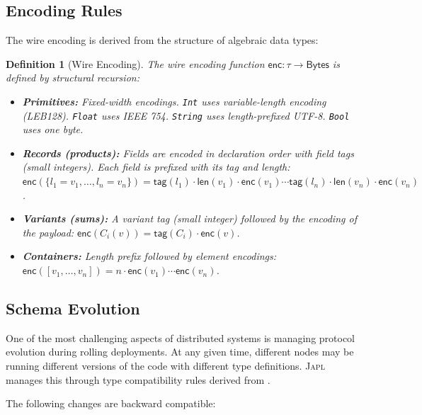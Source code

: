 \documentclass[11pt,a4paper]{article}
\newtheorem{definition}[theorem]{Definition}
\newcommand{\japl}{\textsc{Japl}}
\begin{document}
\subsection{Encoding Rules}

The wire encoding is derived from the structure of algebraic data types:

\begin{definition}[Wire Encoding]
The wire encoding function $\mathsf{enc} : \tau \to \mathsf{Bytes}$ is
defined by structural recursion:
\begin{itemize}[nosep]
  \item \textbf{Primitives:} Fixed-width encodings. \texttt{Int} uses
        variable-length encoding (LEB128). \texttt{Float} uses IEEE 754.
        \texttt{String} uses length-prefixed UTF-8. \texttt{Bool} uses
        one byte.
  \item \textbf{Records (products):} Fields are encoded in declaration
        order with field tags (small integers). Each field is prefixed
        with its tag and length:
        $\mathsf{enc}(\{l_1 = v_1, \ldots, l_n = v_n\}) =
        \mathsf{tag}(l_1) \cdot \mathsf{len}(v_1) \cdot \mathsf{enc}(v_1)
        \cdots \mathsf{tag}(l_n) \cdot \mathsf{len}(v_n) \cdot
        \mathsf{enc}(v_n)$.
  \item \textbf{Variants (sums):} A variant tag (small integer)
        followed by the encoding of the payload:
        $\mathsf{enc}(C_i(v)) = \mathsf{tag}(C_i) \cdot \mathsf{enc}(v)$.
  \item \textbf{Containers:} Length prefix followed by element encodings:
        $\mathsf{enc}([v_1, \ldots, v_n]) = n \cdot \mathsf{enc}(v_1)
        \cdots \mathsf{enc}(v_n)$.
\end{itemize}
\end{definition}

\subsection{Schema Evolution}

One of the most challenging aspects of distributed systems is managing
protocol evolution during rolling deployments. At any given time, different
nodes may be running different versions of the code with different type
definitions. \japl{} manages this through type compatibility rules derived
from .

The following changes are backward compatible:
\end{document}
